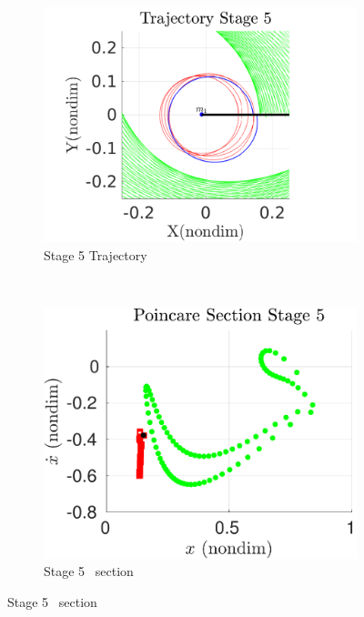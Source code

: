 \documentclass[smallcondensed]{svjour3}
\begin{document}
\begin{figure}[htbp]
    \centering
    \begin{subfigure}[htbp]{0.5\textwidth} 
        \includegraphics[width=\textwidth, keepaspectratio]{figures/geo_transfer/stage5_trajectory_zoom.pdf} 
        \caption{Stage 5 Trajectory~\label{fig:stage5_trajecotry_zoom}} 
    \end{subfigure}~
    \begin{subfigure}[htbp]{0.5\textwidth} 
        \includegraphics[width=\textwidth, keepaspectratio]{figures/geo_transfer/stage5_poincare.pdf} 
        \caption{Stage 5 \Poincare~section \label{fig:stage5_poincare}} 
    \end{subfigure}


\end{figure}
\end{document}
